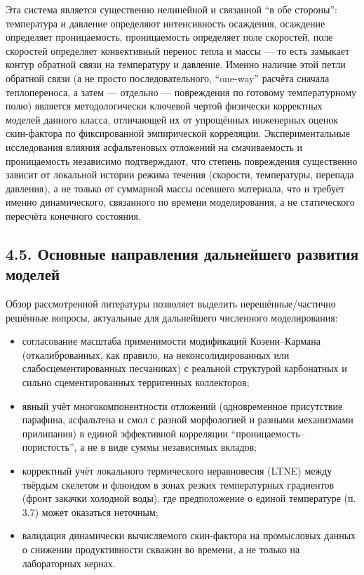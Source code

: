 \documentclass[11pt]{extarticle}
\providecommand{\tightlist}{\setlength{\itemsep}{0pt}\setlength{\parskip}{0pt}}
\begin{document}
Эта система является существенно нелинейной и связанной ``в обе стороны'': температура и давление определяют интенсивность осаждения, осаждение определяет проницаемость, проницаемость определяет поле скоростей, поле скоростей определяет конвективный перенос тепла и массы --- то есть замыкает контур обратной связи на температуру и давление. Именно наличие этой петли обратной связи (а не просто последовательного, ``one-way'' расчёта сначала теплопереноса, а затем --- отдельно --- повреждения по готовому температурному полю) является методологически ключевой чертой физически корректных моделей данного класса, отличающей их от упрощённых инженерных оценок скин-фактора по фиксированной эмпирической корреляции. Экспериментальные исследования влияния асфальтеновых отложений на смачиваемость и проницаемость независимо подтверждают, что степень повреждения существенно зависит от локальной истории режима течения (скорости, температуры, перепада давления), а не только от суммарной массы осевшего материала, что и требует именно динамического, связанного по времени моделирования, а не статического пересчёта конечного состояния.

\subsection{4.5. Основные направления дальнейшего развития моделей}\label{ux43eux441ux43dux43eux432ux43dux44bux435-ux43dux430ux43fux440ux430ux432ux43bux435ux43dux438ux44f-ux434ux430ux43bux44cux43dux435ux439ux448ux435ux433ux43e-ux440ux430ux437ux432ux438ux442ux438ux44f-ux43cux43eux434ux435ux43bux435ux439}

Обзор рассмотренной литературы позволяет выделить нерешённые/частично решённые вопросы, актуальные для дальнейшего численного моделирования:

\begin{itemize}
\tightlist
\item
  согласование масштаба применимости модификаций Козени--Кармана (откалиброванных, как правило, на неконсолидированных или слабосцементированных песчаниках) с реальной структурой карбонатных и сильно сцементированных терригенных коллекторов;
\item
  явный учёт многокомпонентности отложений (одновременное присутствие парафина, асфальтена и смол с разной морфологией и разными механизмами прилипания) в единой эффективной корреляции ``проницаемость--пористость'', а не в виде суммы независимых вкладов;
\item
  корректный учёт локального термического неравновесия (LTNE) между твёрдым скелетом и флюидом в зонах резких температурных градиентов (фронт закачки холодной воды), где предположение о единой температуре (п. 3.7) может оказаться неточным;
\item
  валидация динамически вычисляемого скин-фактора на промысловых данных о снижении продуктивности скважин во времени, а не только на лабораторных кернах.
\end{itemize}
\end{document}
